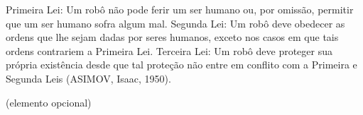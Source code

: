
\begin{epigrafe}%
Primeira Lei: Um robô não pode ferir um ser humano ou, por omissão, permitir que um ser humano sofra algum mal. Segunda Lei: Um robô deve obedecer as ordens que lhe sejam dadas por seres humanos, exceto nos casos em que tais ordens contrariem a Primeira Lei. Terceira Lei: Um robô deve proteger sua própria existência desde que tal proteção não entre em conflito com a Primeira e Segunda Leis (ASIMOV, Isaac, 1950). 

(elemento opcional)
\end{epigrafe}

